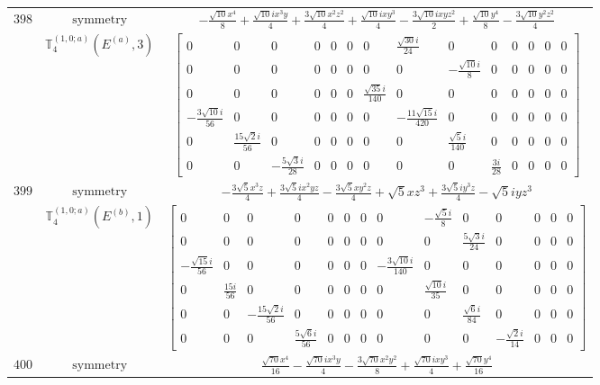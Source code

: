 \documentclass[fleqn,8pt,landscape]{jsarticle}
\begin{document}
\begin{longtable}{ccc}
$ 398 $ & $ \text{symmetry} $ & $ - \frac{\sqrt{10} x^{4}}{8} + \frac{\sqrt{10} i x^{3} y}{4} + \frac{3 \sqrt{10} x^{2} z^{2}}{4} + \frac{\sqrt{10} i x y^{3}}{4} - \frac{3 \sqrt{10} i x y z^{2}}{2} + \frac{\sqrt{10} y^{4}}{8} - \frac{3 \sqrt{10} y^{2} z^{2}}{4} $ \\
$  $ & $ \mathbb{T}_{4}^{(1,0;a)}(E^{(a)},3) $ & $ \begin{bmatrix} 0 & 0 & 0 & 0 & 0 & 0 & 0 & \frac{\sqrt{30} i}{24} & 0 & 0 & 0 & 0 & 0 & 0 \\ 0 & 0 & 0 & 0 & 0 & 0 & 0 & 0 & - \frac{\sqrt{10} i}{8} & 0 & 0 & 0 & 0 & 0 \\ 0 & 0 & 0 & 0 & 0 & 0 & \frac{\sqrt{35} i}{140} & 0 & 0 & 0 & 0 & 0 & 0 & 0 \\ - \frac{3 \sqrt{10} i}{56} & 0 & 0 & 0 & 0 & 0 & 0 & - \frac{11 \sqrt{15} i}{420} & 0 & 0 & 0 & 0 & 0 & 0 \\ 0 & \frac{15 \sqrt{2} i}{56} & 0 & 0 & 0 & 0 & 0 & 0 & \frac{\sqrt{5} i}{140} & 0 & 0 & 0 & 0 & 0 \\ 0 & 0 & - \frac{5 \sqrt{3} i}{28} & 0 & 0 & 0 & 0 & 0 & 0 & \frac{3 i}{28} & 0 & 0 & 0 & 0 \end{bmatrix} $ \\ \hline
$ 399 $ & $ \text{symmetry} $ & $ - \frac{3 \sqrt{5} x^{3} z}{4} + \frac{3 \sqrt{5} i x^{2} y z}{4} - \frac{3 \sqrt{5} x y^{2} z}{4} + \sqrt{5} x z^{3} + \frac{3 \sqrt{5} i y^{3} z}{4} - \sqrt{5} i y z^{3} $ \\
$  $ & $ \mathbb{T}_{4}^{(1,0;a)}(E^{(b)},1) $ & $ \begin{bmatrix} 0 & 0 & 0 & 0 & 0 & 0 & 0 & 0 & - \frac{\sqrt{5} i}{8} & 0 & 0 & 0 & 0 & 0 \\ 0 & 0 & 0 & 0 & 0 & 0 & 0 & 0 & 0 & \frac{5 \sqrt{3} i}{24} & 0 & 0 & 0 & 0 \\ - \frac{\sqrt{15} i}{56} & 0 & 0 & 0 & 0 & 0 & 0 & - \frac{3 \sqrt{10} i}{140} & 0 & 0 & 0 & 0 & 0 & 0 \\ 0 & \frac{15 i}{56} & 0 & 0 & 0 & 0 & 0 & 0 & \frac{\sqrt{10} i}{35} & 0 & 0 & 0 & 0 & 0 \\ 0 & 0 & - \frac{15 \sqrt{2} i}{56} & 0 & 0 & 0 & 0 & 0 & 0 & \frac{\sqrt{6} i}{84} & 0 & 0 & 0 & 0 \\ 0 & 0 & 0 & \frac{5 \sqrt{6} i}{56} & 0 & 0 & 0 & 0 & 0 & 0 & - \frac{\sqrt{2} i}{14} & 0 & 0 & 0 \end{bmatrix} $ \\ \hline
$ 400 $ & $ \text{symmetry} $ & $ \frac{\sqrt{70} x^{4}}{16} - \frac{\sqrt{70} i x^{3} y}{4} - \frac{3 \sqrt{70} x^{2} y^{2}}{8} + \frac{\sqrt{70} i x y^{3}}{4} + \frac{\sqrt{70} y^{4}}{16} $ \\

\end{longtable}
\end{document}

